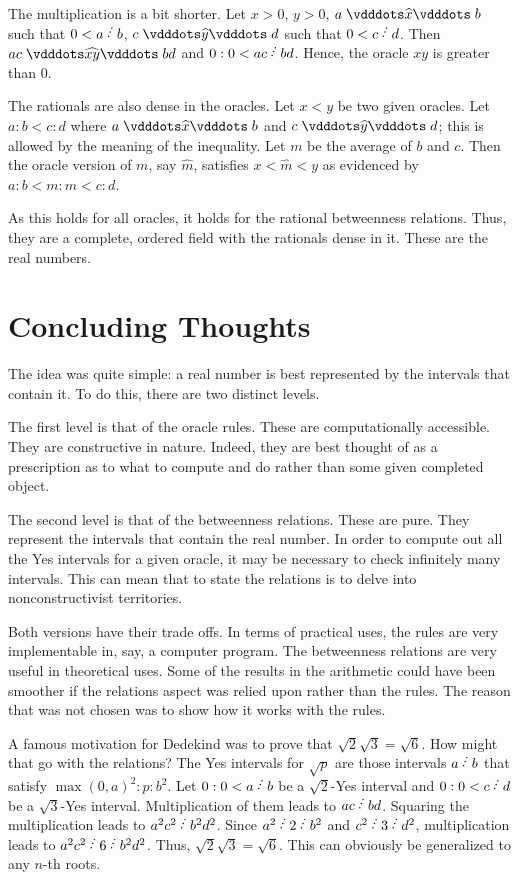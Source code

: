 \documentclass[12pt]{article}
\begin{document}
The multiplication is a bit shorter. Let $x >0 $, $y >0$, $a \xora b$ such that $0<a \lte b$, $c \xora[y] d$ such that $0 < c \lte d$. Then $ac \xora[xy] bd$ and $0:0 < ac \lte bd$. Hence, the oracle $xy$ is greater than 0. 

The rationals are also dense in the oracles. Let $x < y$ be two given oracles. Let $a:b < c:d$ where $a \xora b$ and $c \xora[y] d$; this is allowed by the meaning of the inequality. Let $m$ be the average of $b$ and $c$. Then the oracle version of $m$, say $\widehat{m}$, satisfies $x < \widehat{m} < y$ as evidenced by $a:b < m:m < c:d$.

As this holds for all oracles, it holds for the rational betweenness relations. Thus, they are a complete, ordered field with the rationals dense in it. These are the real numbers. 


\section{Concluding Thoughts}

The idea was quite simple: a real number is best represented by the intervals that contain it. To do this, there are two distinct levels. 

The first level is that of the oracle rules. These are computationally accessible. They are constructive in nature. Indeed, they are best thought of as a prescription as to what to compute and do rather than some given completed object. 

The second level is that of the betweenness relations. These are pure. They represent the intervals that contain the real number. In order to compute out all the Yes intervals for a given oracle, it may be necessary to check infinitely many intervals. This can mean that to state the relations is to delve into nonconstructivist territories. 

Both versions have their trade offs. In terms of practical uses, the rules are very implementable in, say, a computer program. The betweenness relations are very useful in theoretical uses. Some of the results in the arithmetic could have been smoother if the relations aspect was relied upon rather than the rules. The reason that was not chosen was to show how it works with the rules. 

A famous motivation for Dedekind was to prove that $\sqrt{2} \sqrt{3} = \sqrt{6}$. How might that go with the relations? The Yes intervals for $\sqrt{p}$ are those intervals $a \lte b$ that satisfy $\max(0,a)^2 : p : b^2$. Let $0:0 < a \lte b$ be a $\sqrt{2}$-Yes interval and $0:0 < c\lte d$ be a $\sqrt{3}$-Yes interval. Multiplication of them leads to $ac \lte bd$. Squaring the multiplication leads to $a^2 c^2 \lte b^2 d^2$. Since $a^2 \lte 2 \lte b^2$ and $c^2 \lte 3 \lte d^2$, multiplication leads to $a^2 c^2 \lte 6 \lte b^2 d^2$. Thus, $\sqrt{2} \sqrt{3} = \sqrt{6}$. This can obviously be generalized to any $n$-th roots. 
\end{document}
